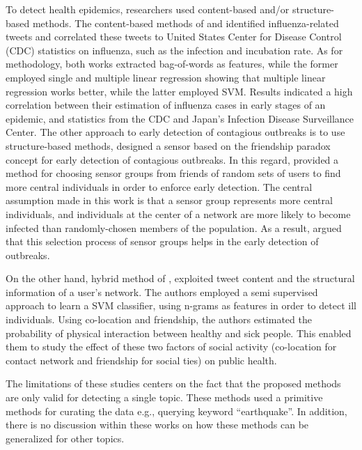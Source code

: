 To detect health epidemics, researchers used content-based and/or structure-based methods. The content-based methods of \cite{culotta} and \cite{aramaki} identified influenza-related tweets and correlated these tweets to United States Center for Disease Control (CDC) statistics on influenza, such as the infection and incubation rate. As for methodology, both works extracted bag-of-words as features, while the former employed single and multiple linear regression showing that multiple linear regression works better, while the latter employed SVM. Results indicated a high correlation between their estimation of influenza cases in early stages of an epidemic, and statistics from the CDC and Japan's Infection Disease Surveillance Center. The other approach to early detection of contagious outbreaks is to use structure-based methods, \cite{garcia} designed a sensor based on the friendship paradox concept for early detection of contagious outbreaks. In this regard, \citeauthor{garcia} provided a method for choosing sensor groups from friends of random sets of users to find more central individuals in order to enforce early detection. The central assumption made in this work is that a sensor group represents more central individuals, and individuals at the center of a network are more likely to become infected than randomly-chosen members of the population. As a result, \cite{garcia} argued that this selection process of sensor groups helps in the early detection of outbreaks.

On the other hand, hybrid method of \cite{sadilek}, exploited tweet content and the structural information of a user's network. The authors employed a semi supervised approach to learn a SVM classifier, using n-grams as features in order to detect ill individuals. Using co-location and friendship, the authors estimated the probability of physical interaction between healthy and sick people. This enabled them to study the effect of these two factors of social activity (co-location for contact network and friendship for social ties) on public health.

The limitations of these studies centers on the fact that the proposed methods are only valid for detecting a single topic. These methods used a primitive methods for curating the data e.g., querying keyword “earthquake”. In addition, there is no discussion within these works on how these methods can be generalized for other topics.

